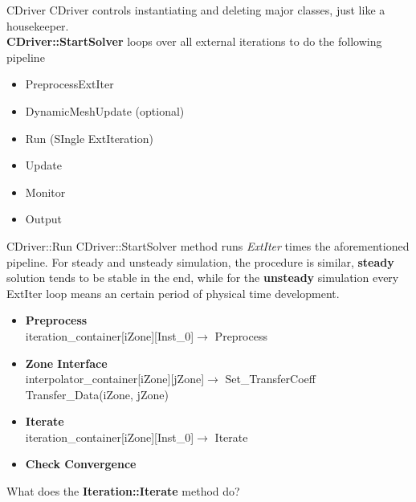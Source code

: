 \begin{frame}{CDriver}
CDriver controls instantiating and deleting major classes, just like a housekeeper.\\
\textbf{CDriver::StartSolver} loops over all external iterations to do the following pipeline
\begin{itemize}
    \item PreprocessExtIter
    \item DynamicMeshUpdate (optional)
    \item Run (SIngle ExtIteration)
    \item Update
    \item Monitor
    \item Output
\end{itemize}
\end{frame}

\begin{frame}{CDriver::Run }
CDriver::StartSolver method runs \emph{ExtIter} times the aforementioned pipeline. For steady and unsteady simulation, the procedure is similar, \textbf{steady} solution tends to be stable in the end, while for the \textbf{unsteady} simulation every ExtIter loop means an certain period of physical time development. 
\begin{itemize}
    \item \textbf{Preprocess}\\
            iteration\_container[iZone][Inst\_0]$\longrightarrow$ Preprocess
    \item \textbf{Zone Interface}\\
            interpolator\_container[iZone][jZone]$\longrightarrow$ Set\_TransferCoeff
            Transfer\_Data(iZone, jZone)\\
    \item \textbf{Iterate}\\
            iteration\_container[iZone][Inst\_0]$\longrightarrow$ Iterate
    \item \textbf{Check Convergence}
\end{itemize}
What does the \textbf{Iteration::Iterate} method do?
\end{frame}

